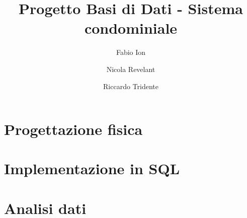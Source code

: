 \documentclass[11pt]{article}
\title{Progetto Basi di Dati - Sistema condominiale}
\author{
	Fabio Ion
	\and
	Nicola Revelant
	\and
	Riccardo Tridente
}
\begin{document}
\maketitle

\tableofcontents









\section{Progettazione fisica}

\section{Implementazione in SQL}

\section{Analisi dati}
\end{document}
